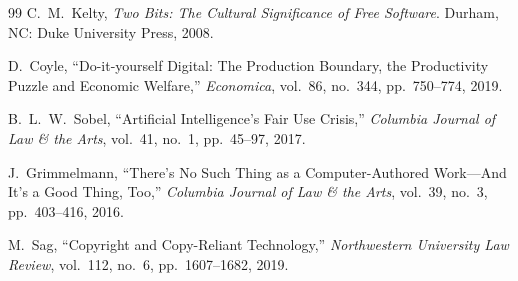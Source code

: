 \documentclass[11pt,twocolumn]{article}
\begin{document}
\begin{thebibliography}{99}
C.~M.~Kelty, \emph{Two Bits: The Cultural Significance of Free
Software}. Durham, NC: Duke University Press, 2008.

D.~Coyle, ``Do-it-yourself Digital: The Production Boundary, the
Productivity Puzzle and Economic Welfare,'' \emph{Economica}, vol.~86,
no.~344, pp.~750--774, 2019.

B.~L.~W.~Sobel, ``Artificial Intelligence's Fair Use Crisis,''
\emph{Columbia Journal of Law \& the Arts}, vol.~41, no.~1, pp.~45--97,
2017.

J.~Grimmelmann, ``There's No Such Thing as a Computer-Authored Work---And
It's a Good Thing, Too,'' \emph{Columbia Journal of Law \& the Arts},
vol.~39, no.~3, pp.~403--416, 2016.

M.~Sag, ``Copyright and Copy-Reliant Technology,'' \emph{Northwestern
University Law Review}, vol.~112, no.~6, pp.~1607--1682, 2019.

\end{thebibliography}
\end{document}
